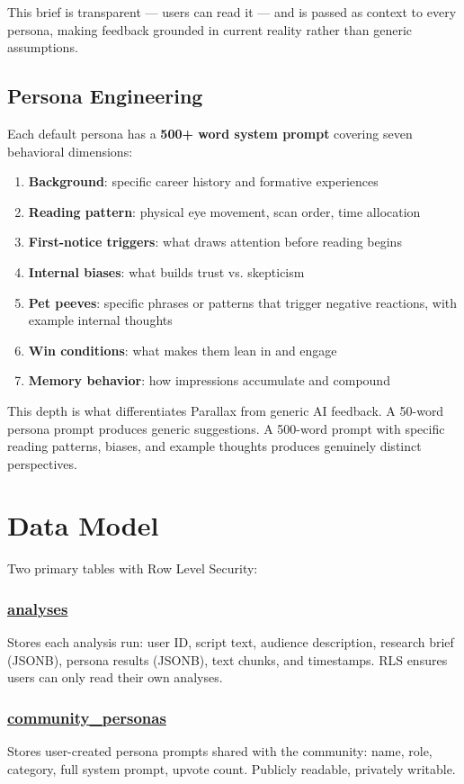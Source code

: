 \documentclass[a4paper, 11pt, twocolumn]{article}
\newcommand{\heady}[1]{\subsubsection*{\underline{#1}}}
\begin{document}
This brief is transparent --- users can read it --- and is passed as context to every persona, making feedback grounded in current reality rather than generic assumptions.

\subsection{Persona Engineering}

Each default persona has a \textbf{500+ word system prompt} covering seven behavioral dimensions:

\begin{enumerate}[nosep, leftmargin=1.2em]
    \item \textbf{Background}: specific career history and formative experiences
    \item \textbf{Reading pattern}: physical eye movement, scan order, time allocation
    \item \textbf{First-notice triggers}: what draws attention before reading begins
    \item \textbf{Internal biases}: what builds trust vs. skepticism
    \item \textbf{Pet peeves}: specific phrases or patterns that trigger negative reactions, with example internal thoughts
    \item \textbf{Win conditions}: what makes them lean in and engage
    \item \textbf{Memory behavior}: how impressions accumulate and compound
\end{enumerate}

This depth is what differentiates Parallax from generic AI feedback. A 50-word persona prompt produces generic suggestions. A 500-word prompt with specific reading patterns, biases, and example thoughts produces genuinely distinct perspectives.

\section{Data Model}

Two primary tables with Row Level Security:

\heady{analyses}
Stores each analysis run: user ID, script text, audience description, research brief (JSONB), persona results (JSONB), text chunks, and timestamps. RLS ensures users can only read their own analyses.

\heady{community\_personas}
Stores user-created persona prompts shared with the community: name, role, category, full system prompt, upvote count. Publicly readable, privately writable.
\end{document}
